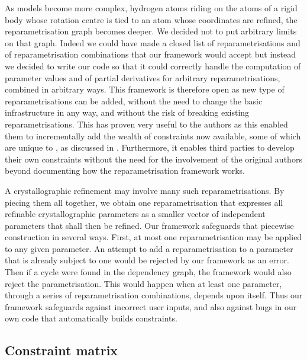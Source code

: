 \documentclass[11pt]{article}
\begin{document}
As models become more complex,  hydrogen atoms riding on the atoms of a rigid body whose rotation centre is tied to an atom whose coordinates are refined, the reparametrisation graph becomes deeper. We decided not to put arbitrary limits on that graph. Indeed we could have made a closed list of reparametrisations and of reparametrisation combinations  that our framework would accept but instead we decided to write our code so that it could correctly handle the computation of parameter values and of partial derivatives for arbitrary reparametrisations, combined in arbitrary ways. This framework is therefore open as new type of reparametrisations can be added, without the need to change the basic infrastructure in any way, and without the risk of breaking existing reparametrisations. This has proven very useful to the authors as this enabled them to incrementally add the wealth of constraints now available, some of which are unique to \olexrefine, as discussed in . Furthermore, it enables third parties to develop their own constraints without the need for the involvement of the original authors beyond documenting how the reparametrisation framework works.

A crystallographic refinement may involve many such reparametrisations. By piecing them all together, we obtain one reparametrisation that expresses all refinable crystallographic parameters as a smaller vector of independent parameters that shall then be refined. Our framework safeguards that piecewise construction in several ways. First, at most one reparametrisation may be applied to any given parameter. An attempt to add a reparametrisation to a parameter that is already subject to one would be rejected by our framework as an error. Then if a cycle were found in the dependency graph, the framework would also reject the parametrisation. This would happen when at least one parameter, through a series of reparametrisation combinations, depends upon itself. Thus our framework safeguards against incorrect user inputs, and also against bugs in our own code that automatically builds constraints.

\subsection{Constraint matrix}
\end{document}
